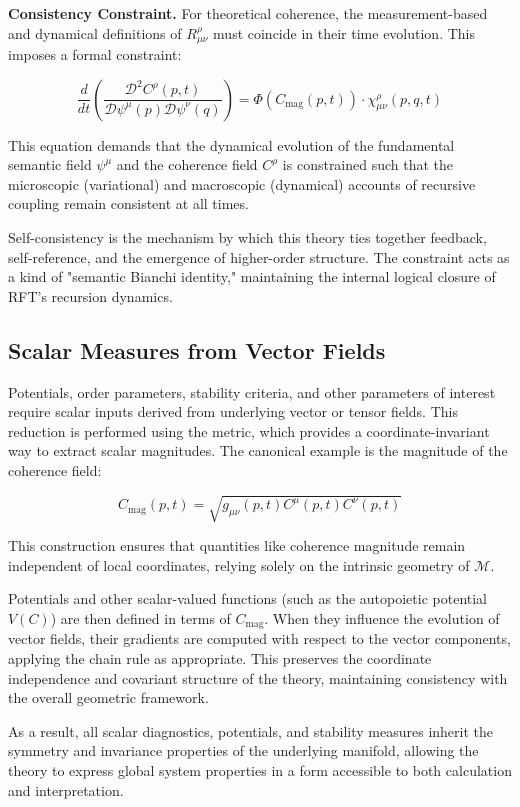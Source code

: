 \textbf{Consistency Constraint.} For theoretical coherence, the measurement-based and dynamical definitions of \(R^\rho_{\mu\nu}\) must coincide in their time evolution. This imposes a formal constraint:

\begin{equation}
\label{eq:R_consistency}
\frac{d}{dt} \left( \frac{\mathcal{D}^2 C^\rho(p, t)}{\mathcal{D} \psi^\mu(p) \mathcal{D} \psi^\nu(q)} \right) = \Phi(C_{\mathrm{mag}}(p, t)) \cdot \chi^\rho_{\mu\nu}(p, q, t)
\end{equation}

This equation demands that the dynamical evolution of the fundamental semantic field \(\psi^\mu\) and the coherence field \(C^\rho\) is constrained such that the microscopic (variational) and macroscopic (dynamical) accounts of recursive coupling remain consistent at all times.

Self-consistency is the mechanism by which this theory ties together feedback, self-reference, and the emergence of higher-order structure. The constraint acts as a kind of "semantic Bianchi identity," maintaining the internal logical closure of RFT's recursion dynamics.


\subsection{Scalar Measures from Vector Fields}
\label{2.4.8:scalar_measures_from_vector_fields}

Potentials, order parameters, stability criteria, and other parameters of interest require scalar inputs derived from underlying vector or tensor fields. This reduction is performed using the metric, which provides a coordinate-invariant way to extract scalar magnitudes. The canonical example is the magnitude of the coherence field:

\begin{equation}
C_{\mathrm{mag}}(p,t) = \sqrt{g_{\mu\nu}(p,t) C^\mu(p,t) C^\nu(p,t)}
\end{equation}

This construction ensures that quantities like coherence magnitude remain independent of local coordinates, relying solely on the intrinsic geometry of \(\mathcal{M}\).

Potentials and other scalar-valued functions (such as the autopoietic potential \(V(C)\)) are then defined in terms of \(C_{\mathrm{mag}}\). When they influence the evolution of vector fields, their gradients are computed with respect to the vector components, applying the chain rule as appropriate. This preserves the coordinate independence and covariant structure of the theory, maintaining consistency with the overall geometric framework.

As a result, all scalar diagnostics, potentials, and stability measures inherit the symmetry and invariance properties of the underlying manifold, allowing the theory to express global system properties in a form accessible to both calculation and interpretation.